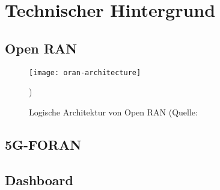 \chapter{Technischer Hintergrund}
\label{chap:technischerHintergrund}
\section{Open RAN}
\label{sec:oran}
\begin{figure}
    \centering
    \texttt{[image: oran-architecture]}
    \caption{Logische Architektur von Open RAN (Quelle: \parencite{o-ranworkgroup1usecasesandoverallarchitectureORANArchitectureDescription}})
    \label{fig:oran-components}
\end{figure}
\section{5G-FORAN}
\label{sec:foran}
\section{Dashboard}
\label{sec:dashboard}

